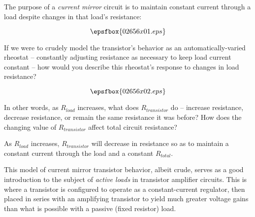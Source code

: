 

The purpose of a {\it current mirror} circuit is to maintain constant current through a load despite changes in that load's resistance:

$$\epsfbox{02656x01.eps}$$

If we were to crudely model the transistor's behavior as an automatically-varied rheostat -- constantly adjusting resistance as necessary to keep load current constant -- how would you describe this rheostat's response to changes in load resistance?

$$\epsfbox{02656x02.eps}$$

In other words, as $R_{load}$ increases, what does $R_{transistor}$ do -- increase resistance, decrease resistance, or remain the same resistance it was before?  How does the changing value of $R_{transistor}$ affect total circuit resistance?







As $R_{load}$ increases, $R_{transistor}$ will decrease in resistance so as to maintain a constant current through the load and a constant $R_{total}$.







This model of current mirror transistor behavior, albeit crude, serves as a good introduction to the subject of {\it active loads} in transistor amplifier circuits.  This is where a transistor is configured to operate as a constant-current regulator, then placed in series with an amplifying transistor to yield much greater voltage gains than what is possible with a passive (fixed resistor) load.




